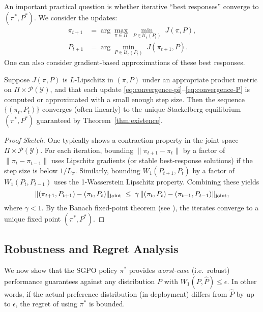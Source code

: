 An important practical question is whether iterative “best responses” converge to $(\pi^*, P^*)$.  We consider the updates:
\begin{align}
\pi_{t+1}
&=
\arg\max_{\pi\in \Pi}\,
\min_{P\in \mathcal{U}_\epsilon(P_t)}
\;J(\pi,P),
\label{eq:convergence-pi}
\\[3pt]
P_{t+1}
&=
\arg\min_{P\in \mathcal{U}_\epsilon(P_t)}
\;J(\pi_{t+1},P).
\label{eq:convergence-P}
\end{align}
One can also consider gradient-based approximations of these best responses.

\begin{theorem}
\label{thm:convergence}
Suppose $J(\pi,P)$ is $L$-Lipschitz in $(\pi,P)$ under an appropriate product metric on $\Pi\times \mathcal{P}(\mathcal{Y})$, and that each update \eqref{eq:convergence-pi}--\eqref{eq:convergence-P} is computed or approximated with a small enough step size.  Then the sequence $\{(\pi_t,P_t)\}$ converges (often linearly) to the unique Stackelberg equilibrium $(\pi^*,P^*)$ guaranteed by Theorem~\ref{thm:existence}.
\end{theorem}

\begin{proof}[Proof Sketch]
One typically shows a contraction property in the joint space $\Pi\times \mathcal{P}(\mathcal{Y})$.  For each iteration, bounding $\|\pi_{t+1}-\pi_t\|$ by a factor of $\|\pi_t-\pi_{t-1}\|$ uses Lipschitz gradients (or stable best-response solutions) if the step size is below $1/L_\pi$.  Similarly, bounding $W_1(P_{t+1},P_t)$ by a factor of $W_1(P_t,P_{t-1})$ uses the 1-Wasserstein Lipschitz property.  Combining these yields
\[
\|(\pi_{t+1},P_{t+1}) - (\pi_t,P_t)\|_{\rm joint}
\;\le\;
\gamma\,\|(\pi_t,P_t) - (\pi_{t-1},P_{t-1})\|_{\rm joint},
\]
where $\gamma<1$.  By the Banach fixed-point theorem (see \cite[\S 1.2]{kirk2001handbook}), the iterates converge to a unique fixed point $(\pi^*,P^*)$.
\end{proof}


\subsection{Robustness and Regret Analysis}
\label{sec:robustness}

We now show that the SGPO policy $\pi^*$ provides \emph{worst-case} (i.e.\ robust) performance guarantees against any distribution $P$ with $W_1(P,\hat{P})\le \epsilon$.  In other words, if the actual preference distribution (in deployment) differs from $\hat{P}$ by up to $\epsilon$, the regret of using $\pi^*$ is bounded.

